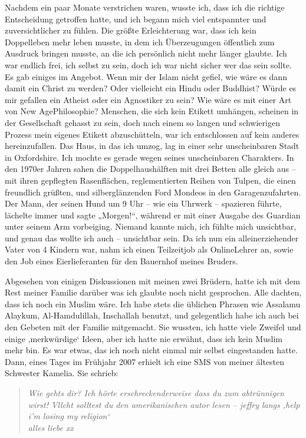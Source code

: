 \documentclass[12pt]{memoir}
\begin{document}
Nachdem ein paar Monate verstrichen waren, wusste ich,
dass ich die richtige Entscheidung getroffen hatte,
und ich begann mich viel entspannter und zuversichtlicher zu fühlen.
Die größte Erleichterung war, dass ich kein Doppelleben mehr leben musste,
in dem ich Überzeugungen öffentlich zum Ausdruck bringen musste,
an die ich persönlich nicht mehr länger glaubte.
Ich war endlich frei, ich selbst zu sein,
doch ich war nicht sicher wer das sein sollte.
Es gab einiges im Angebot.
Wenn mir der Islam nicht gefiel,
wie wäre es dann damit ein Christ zu werden?
Oder vielleicht ein Hindu oder Buddhist?
Würde es mir gefallen ein Atheist oder ein Agnostiker zu sein?
Wie wäre es mit einer Art von New Age\–Philosophie?
Menschen, die sich kein Etikett umhängen,
scheinen in der Gesellschaft gehasst zu sein,
doch nach einem so langen und schwierigen Prozess
mein eigenes Etikett abzuschütteln,
war ich entschlossen auf kein anderes hereinzufallen.
Das Haus, in das ich umzog,
lag in einer sehr unscheinbaren Stadt in Oxfordshire.
Ich mochte es gerade wegen seines unscheinbaren Charakters.
In den 1970er Jahren sahen die Doppelhaushälften mit drei Betten
alle gleich aus – mit ihren gepflegten Rasenflächen,
reglementierten Reihen von Tulpen, die einen freundlich grüßten,
und silberglänzenden Ford Mondeos in den Garagenzufahrten.
Der Mann, der seinen Hund um 9 Uhr – wie ein Uhrwerk –
spazieren führte, lächelte immer und sagte „Morgen!“,
während er mit einer Ausgabe des Guardian unter seinem Arm vorbeiging.
Niemand kannte mich, ich fühlte mich unsichtbar,
und genau das wollte ich auch – unsichtbar sein.
Da ich nun ein alleinerziehender Vater von 4 Kindern war,
nahm ich einen Teilzeitjob als Online\–Lehrer an,
sowie den Job eines Eierlieferanten für den Bauernhof meines Bruders.

Abgesehen von einigen Diskussionen mit meinen zwei Brüdern,
hatte ich mit dem Rest meiner Familie
darüber was ich glaubte noch nicht gesprochen.
Alle dachten, dass ich noch ein Muslim wäre.
Ich habe stets die üblichen Phrasen
wie Assalamu Alaykum, Al-Hamdulillah, Inschallah benutzt,
und gelegentlich habe ich auch bei den Gebeten mit der Familie mitgemacht.
Sie wussten, ich hatte viele Zweifel und einige ‚merkwürdige‘ Ideen,
aber ich hatte nie erwähnt, dass ich kein Muslim mehr bin.
Es war etwas, das ich noch nicht einmal mir selbst eingestanden hatte.
Dann, eines Tages im Frühjahr 2007 erhielt ich eine SMS
von meiner ältesten Schwester Kamelia. Sie schrieb:

\begin{quote}
\itshape
Wie gehts dir?
Ich hörte erschreckenderweise dass du zum abtrünnigen wirst!
Vllcht solltest du den amerikanischen autor lesen –
jeffry langs ‚help i’m losing my religion‘\\
alles liebe xx
\end{quote}
\end{document}
